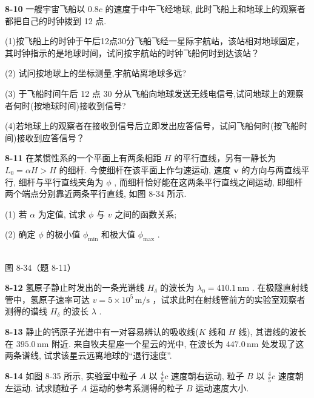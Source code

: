 \newpage

\textbf{8-10} 一艘宇宙飞船以 $0.8c$ 的速度于中午飞经地球, 此时飞船上和地球上的观察者都把自己的时钟拨到 12 点.

(1)按飞船上的时钟于午后12点30分飞船飞经一星际宇航站，该站相对地球固定，其时钟指示的是地球时间，试问按宇航站的时钟飞船何时到达该站？

(2) 试问按地球上的坐标测量,宇航站离地球多远?

(3) 于飞船时间午后 12 点 30 分从飞船向地球发送无线电信号,试问地球上的观察者何时(按地球时间)接收到信号?

(4)若地球上的观察者在接收到信号后立即发出应答信号，试问飞船何时(按飞船时间)接收到应答信号？

\newpage

\textbf{8-11} 在某惯性系的一个平面上有两条相距 $H$ 的平行直线，另有一静长为 $L_{0} = \alpha H > H$ 的细杆. 今使细杆在该平面上作匀速运动, 速度 $\pmb{v}$ 的方向与两直线平行, 细杆与平行直线夹角为 $\phi$ , 而细杆恰好能在这两条平行直线之间运动, 即细杆两个端点分别靠近两条平行直线, 如图 8-34 所示.

(1) 若 $\alpha$ 为定值, 试求 $\phi$ 与 $v$ 之间的函数关系;

(2) 确定 $\phi$ 的极小值 $\phi_{\min}$ 和极大值 $\phi_{\max}$ .

\begin{center}
\resizebox{0.50\textwidth}{!}{}\\[4pt]
{\small 图 8-34（题 8-11）}
\end{center}

\newpage

\textbf{8-12} 氢原子静止时发出的一条光谱线 $H_{\delta}$ 的波长为 $\lambda_{0}=410.1\,\mathrm{nm}$ . 在极隧直射线管中，氢原子速率可达 $v=5\times10^{5}\,\mathrm{m/s}$ ，试求此时在射线管前方的实验室观察者测得的谱线 $H_{\delta}$ 的波长 $\lambda$ .

\newpage

\textbf{8-13} 静止的钙原子光谱中有一对容易辨认的吸收线($K$ 线和 $H$ 线), 其谱线的波长在 $395.0\,\mathrm{nm}$ 附近. 来自牧夫星座一个星云的光中, 在波长为 $447.0\,\mathrm{nm}$ 处发现了这两条谱线, 试求该星云远离地球的“退行速度”.

\newpage

\textbf{8-14} 如图 8-35 所示, 实验室中粒子 $A$ 以 $\frac{4}{5}c$ 速度朝右运动, 粒子 $B$ 以 $\frac{4}{5} c$ 速度朝左运动. 试求随粒子 $A$ 运动的参考系测得的粒子 $B$ 运动速度大小.

